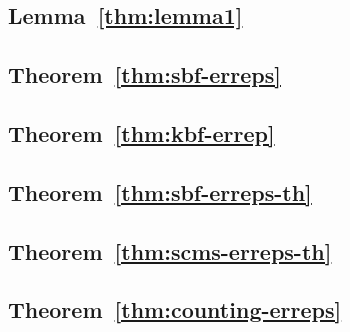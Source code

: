 \label{sec:keyless-proof}
\label{sec:proof/sbf-erreps}
\label{sec:proof/kbf-errep}
\label{sec:proof/sbf-erreps-th}
\label{sec:proof/scms-erreps-th}
\label{sec:proof/counting-erreps}

\subsection*{Lemma~\ref{thm:lemma1}}


\subsection*{Theorem~\ref{thm:sbf-erreps}}


\subsection*{Theorem~\ref{thm:kbf-errep}}


\subsection*{Theorem~\ref{thm:sbf-erreps-th}}


\subsection*{Theorem~\ref{thm:scms-erreps-th}}


\subsection*{Theorem~\ref{thm:counting-erreps}}

